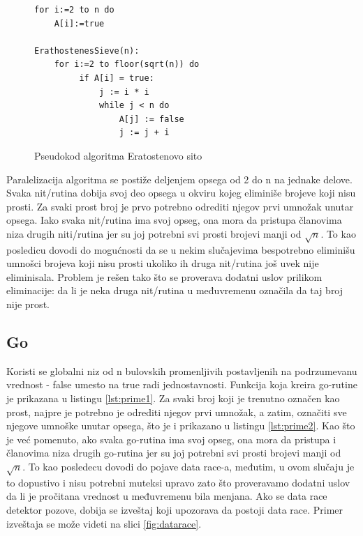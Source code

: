\documentclass[12pt,oneside]{memoir}
\begin{document}
\begin{figure}
\begin{center}

\begin{Verbatim}[fontsize=\small]
for i:=2 to n do
    A[i]:=true

ErathostenesSieve(n):
    for i:=2 to floor(sqrt(n)) do 
         if A[i] = true:
             j := i * i
             while j < n do
                 A[j] := false 
                 j := j + i
\end{Verbatim}

\caption{Pseudokod algoritma Eratostenovo sito}
\label{fig:prime_pseudo}
\end{center}
\end{figure}

Paralelizacija algoritma se postiže deljenjem opsega od 2 do n na jednake delove. Svaka nit/rutina dobija svoj deo opsega u okviru kojeg eliminiše brojeve koji nisu prosti. Za svaki prost broj je prvo potrebno odrediti njegov prvi umnožak unutar opsega. Iako svaka nit/rutina ima svoj opseg, ona mora da pristupa članovima niza drugih niti/rutina jer su joj potrebni svi prosti brojevi manji od $\sqrt{n}$. To kao posledicu dovodi do mogućnosti da se u nekim slučajevima bespotrebno eliminišu umnošci brojeva koji nisu prosti ukoliko ih druga nit/rutina još uvek nije eliminisala. Problem je rešen tako što se proverava dodatni uslov prilikom eliminacije: da li je neka druga nit/rutina u međuvremenu označila da taj broj nije prost.


\subsection{Go}

Koristi se globalni niz od n bulovskih promenljivih postavljenih na podrzumevanu vrednost - false umesto na true radi jednostavnosti.  Funkcija koja kreira go-rutine je prikazana u listingu \ref{lst:prime1}. Za svaki broj koji je trenutno označen kao prost, najpre je potrebno je odrediti njegov prvi umnožak, a zatim, označiti sve njegove umnoške unutar opsega, što je i prikazano u listingu \ref{lst:prime2}. Kao što je već pomenuto, ako svaka go-rutina ima svoj opseg, ona mora da pristupa i članovima niza drugih go-rutina jer su joj potrebni svi prosti brojevi manji od $\sqrt{n}$. To kao posledecu dovodi do pojave data race-a, međutim, u ovom slučaju je to dopustivo i nisu potrebni muteksi upravo zato što proveravamo dodatni uslov da li je pročitana vrednost u međuvremenu bila menjana. Ako se data race detektor pozove, dobija se izveštaj koji upozorava da postoji data race. Primer izveštaja se može videti na slici \ref{fig:datarace}. 
\end{document}

